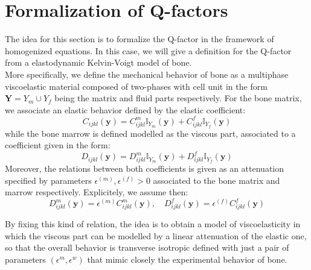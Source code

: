 \section{Formalization of Q-factors}
The idea for this section is to formalize the Q-factor in the framework of homogenized equations.
In this case, we will give a definition for the Q-factor from a elastodynamic Kelvin-Voigt model of bone.\\
More specifically, we define the mechanical behavior of bone as a multiphase viscoelastic material composed of two-phases with cell unit in the form $\mathbf{Y} = Y_{m} \cup Y_{f}$ being the matrix and fluid parts respectively.
For the bone matrix, we associate an elastic behavior defined by the elastic coefficient:
\begin{equation*}
    C_{ijkl}(\mathbf{y}) = C_{ijkl}^m \mathbb{I}_{Y_m}(\mathbf{y}) + C_{ijkl}^f \mathbb{I}_{Y_f}(\mathbf{y})
\end{equation*}
while the bone marrow is defined modelled as the viscous part, associated to a coefficient given in the form:
\begin{equation*}
    D_{ijkl}(\mathbf{y}) =  D_{ijkl}^m \mathbb{I}_{Y_m}(\mathbf{y}) + D_{ijkl}^f \mathbb{I}_{Y_f}(\mathbf{y})
\end{equation*}
Moreover, the relations between both coefficients is given as an attenuation specified by parameters $\epsilon^{(m)}, \epsilon^{(f)} >0$ associated to the bone matrix and marrow respectively. Explicitely, we assume then:
\begin{equation*}
    D_{ijkl}^m(\mathbf{y}) = \epsilon^{(m)} C_{ijkl}^m(\mathbf{y}) , \quad D_{ijkl}^f (\mathbf{y}) = \epsilon^{(f)} C_{ijkl}^f(\mathbf{y})
\end{equation*}


\begin{rem}
By fixing this kind of relation, the idea is to obtain a model of viscoelasticity in which the viscous part can be modelled by a linear attenuation of the elastic one, so that the overall behavior is transverse isotropic defined with just a pair of parameters $(\epsilon^m, \epsilon^w)$ that mimic closely the experimental behavior of bone.
\end{rem}

